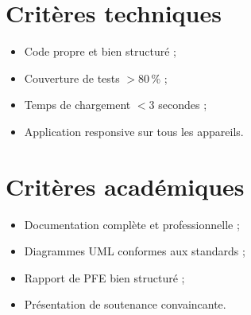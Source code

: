 \documentclass[12pt,a4paper]{report}
\begin{document}
\section{Critères techniques}

\begin{itemize}
  \item Code propre et bien structuré ;
  \item Couverture de tests $> 80$\,\% ;
  \item Temps de chargement $< 3$ secondes ;
  \item Application responsive sur tous les appareils.
\end{itemize}

\section{Critères académiques}

\begin{itemize}
  \item Documentation complète et professionnelle ;
  \item Diagrammes UML conformes aux standards ;
  \item Rapport de PFE bien structuré ;
  \item Présentation de soutenance convaincante.
\end{itemize}

\end{document}
